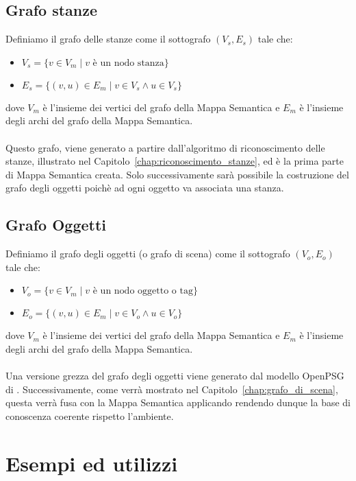 \subsection{Grafo stanze}
Definiamo il grafo delle stanze come il sottografo $(V_s, E_s)$ tale che:
\begin{itemize}
  \item $V_s = \{v \in V_m \mid v \text{ è un nodo stanza} \}$
  \item $E_s = \{(v,u) \in E_m \mid v \in V_s \wedge u \in V_s \}$
\end{itemize}
dove $V_m$ è l'insieme dei vertici del grafo della Mappa Semantica e $E_m$ è l'insieme degli archi del grafo della Mappa Semantica. \\\\
Questo grafo, viene generato a partire dall'algoritmo di riconoscimento delle stanze, illustrato nel Capitolo~\ref{chap:riconoscimento_stanze}, ed è la prima parte di Mappa Semantica creata. Solo successivamente sarà possibile la costruzione del grafo degli oggetti poichè ad ogni oggetto va associata una stanza.
\subsection{Grafo Oggetti}
Definiamo il grafo degli oggetti (o grafo di scena) come il sottografo $(V_o, E_o)$ tale che:
\begin{itemize}
  \item $V_o = \{v \in V_m \mid v \text{ è un nodo oggetto o tag} \}$
  \item $E_o = \{(v,u) \in E_m \mid v \in V_o \wedge u \in V_o \}$
\end{itemize}
dove $V_m$ è l'insieme dei vertici del grafo della Mappa Semantica e $E_m$ è l'insieme degli archi del grafo della Mappa Semantica. \\\\
Una versione grezza del grafo degli oggetti viene generato dal modello OpenPSG di \cite{yang2022psg}. Successivamente, come verrà mostrato nel Capitolo~\ref{chap:grafo_di_scena}, questa verrà fusa con la Mappa Semantica applicando rendendo dunque la base di conoscenza coerente rispetto l'ambiente.

\section{Esempi ed utilizzi}

